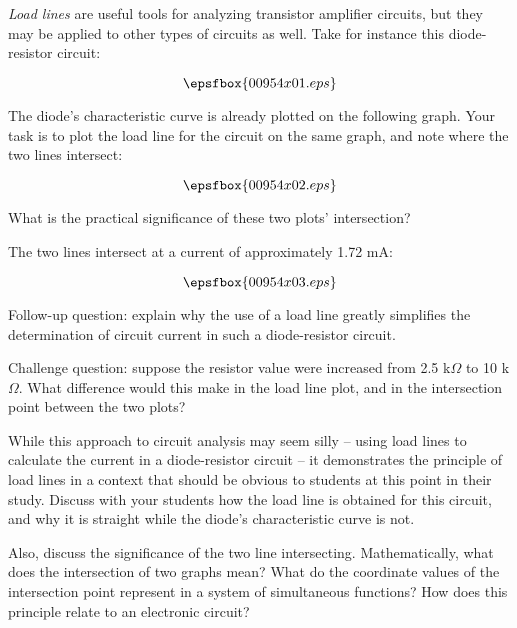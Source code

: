

{\it Load lines} are useful tools for analyzing transistor amplifier circuits, but they may be applied to other types of circuits as well.  Take for instance this diode-resistor circuit:

$$\epsfbox{00954x01.eps}$$

The diode's characteristic curve is already plotted on the following graph.  Your task is to plot the load line for the circuit on the same graph, and note where the two lines intersect:

$$\epsfbox{00954x02.eps}$$

What is the practical significance of these two plots' intersection?







The two lines intersect at a current of approximately 1.72 mA:

$$\epsfbox{00954x03.eps}$$

\vskip 10pt

Follow-up question: explain why the use of a load line greatly simplifies the determination of circuit current in such a diode-resistor circuit.

\vskip 10pt

Challenge question: suppose the resistor value were increased from 2.5 k$\Omega$ to 10 k$\Omega$.  What difference would this make in the load line plot, and in the intersection point between the two plots?







While this approach to circuit analysis may seem silly -- using load lines to calculate the current in a diode-resistor circuit -- it demonstrates the principle of load lines in a context that should be obvious to students at this point in their study.  Discuss with your students how the load line is obtained for this circuit, and why it is straight while the diode's characteristic curve is not.  

Also, discuss the significance of the two line intersecting.  Mathematically, what does the intersection of two graphs mean?  What do the coordinate values of the intersection point represent in a system of simultaneous functions?  How does this principle relate to an electronic circuit?




